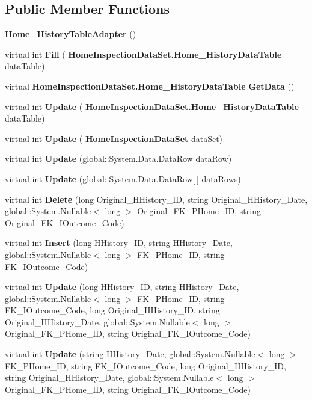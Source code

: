 \subsection*{Public Member Functions}
\begin{DoxyCompactItemize}
\item 
\textbf{ Home\+\_\+\+History\+Table\+Adapter} ()
\item 
virtual int \textbf{ Fill} (\textbf{ Home\+Inspection\+Data\+Set.\+Home\+\_\+\+History\+Data\+Table} data\+Table)
\item 
virtual \textbf{ Home\+Inspection\+Data\+Set.\+Home\+\_\+\+History\+Data\+Table} \textbf{ Get\+Data} ()
\item 
virtual int \textbf{ Update} (\textbf{ Home\+Inspection\+Data\+Set.\+Home\+\_\+\+History\+Data\+Table} data\+Table)
\item 
virtual int \textbf{ Update} (\textbf{ Home\+Inspection\+Data\+Set} data\+Set)
\item 
virtual int \textbf{ Update} (global\+::\+System.\+Data.\+Data\+Row data\+Row)
\item 
virtual int \textbf{ Update} (global\+::\+System.\+Data.\+Data\+Row[$\,$] data\+Rows)
\item 
virtual int \textbf{ Delete} (long Original\+\_\+\+H\+History\+\_\+\+ID, string Original\+\_\+\+H\+History\+\_\+\+Date, global\+::\+System.\+Nullable$<$ long $>$ Original\+\_\+\+F\+K\+\_\+\+P\+Home\+\_\+\+ID, string Original\+\_\+\+F\+K\+\_\+\+I\+Outcome\+\_\+\+Code)
\item 
virtual int \textbf{ Insert} (long H\+History\+\_\+\+ID, string H\+History\+\_\+\+Date, global\+::\+System.\+Nullable$<$ long $>$ F\+K\+\_\+\+P\+Home\+\_\+\+ID, string F\+K\+\_\+\+I\+Outcome\+\_\+\+Code)
\item 
virtual int \textbf{ Update} (long H\+History\+\_\+\+ID, string H\+History\+\_\+\+Date, global\+::\+System.\+Nullable$<$ long $>$ F\+K\+\_\+\+P\+Home\+\_\+\+ID, string F\+K\+\_\+\+I\+Outcome\+\_\+\+Code, long Original\+\_\+\+H\+History\+\_\+\+ID, string Original\+\_\+\+H\+History\+\_\+\+Date, global\+::\+System.\+Nullable$<$ long $>$ Original\+\_\+\+F\+K\+\_\+\+P\+Home\+\_\+\+ID, string Original\+\_\+\+F\+K\+\_\+\+I\+Outcome\+\_\+\+Code)
\item 
virtual int \textbf{ Update} (string H\+History\+\_\+\+Date, global\+::\+System.\+Nullable$<$ long $>$ F\+K\+\_\+\+P\+Home\+\_\+\+ID, string F\+K\+\_\+\+I\+Outcome\+\_\+\+Code, long Original\+\_\+\+H\+History\+\_\+\+ID, string Original\+\_\+\+H\+History\+\_\+\+Date, global\+::\+System.\+Nullable$<$ long $>$ Original\+\_\+\+F\+K\+\_\+\+P\+Home\+\_\+\+ID, string Original\+\_\+\+F\+K\+\_\+\+I\+Outcome\+\_\+\+Code)
\end{DoxyCompactItemize}
